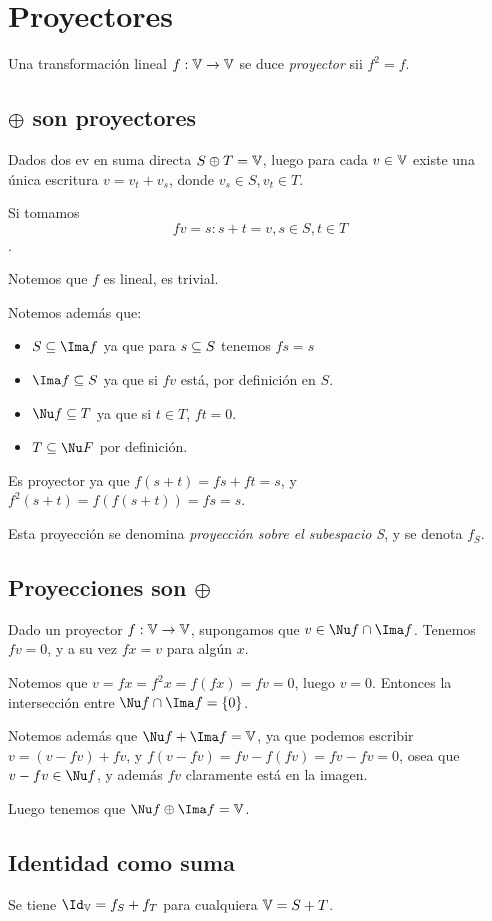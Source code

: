 \documentclass{article}
\begin{document}
\section{Proyectores}
Una transformación lineal $f: \mathbb{V} \to \mathbb{V}$ se duce \emph{proyector} sii $f^2 =
f$.

\subsection{$\oplus$ son proyectores}
Dados dos ev en suma directa $S\oplus T = \mathbb{V}$, 
luego para cada $v \in \mathbb{V}$ existe una única escritura $v = v_t + v_s$,
donde $v_s \in S, v_t \in T$.

Si tomamos \[f v =
s : s + t = v, s \in S, t \in T\].

Notemos que $f$ es lineal, es trivial.

Notemos además que:
\begin{itemize}
	\item $S \inn \Ima f$ ya que para $s \subseteq S$ tenemos $fs = s$
	\item $\Ima f \inn S$ ya que si $fv$ está, por definición en $S$.
	\item $\Nu f \inn T$ ya que si $t \in T$, $f t = 0$.
	\item $T \inn \Nu F$ por definición.
\end{itemize}

Es proyector ya que $f (s+t) = fs + ft = s$, y $f^2 (s+t)
= f(f(s+t)) = fs = s$.

Esta proyección se denomina \emph{proyección sobre el subespacio S},
y se denota $f_{S}$.

\subsection{Proyecciones son $\oplus$}
Dado un proyector $f : \mathbb{V} \to \mathbb{V}$, supongamos que $v \in \Nu f \cap \Ima f$.
Tenemos $f v = 0$, y a su vez $f x = v$ para algún $x$.

Notemos que $v = fx = f^2 x = f (fx) = f v = 0$, luego $v = 0$. Entonces la
intersección entre $\Nu f \cap \Ima f = \{0\}$.

Notemos además que $\Nu f + \Ima f = \V$, ya que podemos escribir $v = (v - fv)
+ fv$, y $f (v-fv) = fv - f(fv) = fv - fv = 0$, osea que $v - fv \in \Nu f$, y
además $fv$ claramente está en la imagen.

Luego tenemos que $\Nu f \oplus \Ima f = \V$.

\subsection{Identidad como suma}
Se tiene $\Id_{\V} = f_{S} + f_{T}$ para cualquiera $\mathbb{V} = S + T$.
\end{document}
